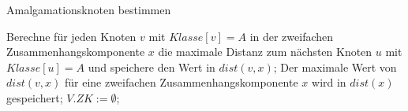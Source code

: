 \begin{algorithm}
\caption{Amalgamationsknoten bestimmen}
\begin{algorithmic}[1]
\vspace{2mm}
\STATE Berechne für jeden Knoten $v$ mit $Klasse[v]=A$ in der zweifachen Zusammenhangskomponente $x$ die maximale Distanz zum nächsten Knoten $u$ mit $Klasse[u]=A$ und speichere den Wert in $dist(v,x)$;
\STATE Der maximale Wert von $dist(v,x)$ für eine zweifachen Zusammenhangskomponente $x$ wird in $dist(x)$ gespeichert;
\STATE $V.ZK:= \emptyset$;
\ENDFOR
\end{algorithmic}
\label{algsonderfall1}
\end{algorithm}
